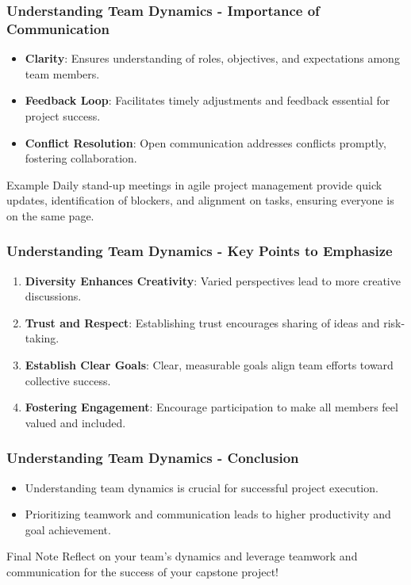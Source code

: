 \documentclass[aspectratio=169]{beamer}
\begin{document}
\begin{frame}[fragile]
    \frametitle{Understanding Team Dynamics - Importance of Communication}
    \begin{itemize}
        \item \textbf{Clarity}: Ensures understanding of roles, objectives, and expectations among team members.
        \item \textbf{Feedback Loop}: Facilitates timely adjustments and feedback essential for project success.
        \item \textbf{Conflict Resolution}: Open communication addresses conflicts promptly, fostering collaboration.
    \end{itemize}
    
    \begin{block}{Example}
        \small
        Daily stand-up meetings in agile project management provide quick updates, identification of blockers, and alignment on tasks, ensuring everyone is on the same page.
    \end{block}
\end{frame}

\begin{frame}[fragile]
    \frametitle{Understanding Team Dynamics - Key Points to Emphasize}
    \begin{enumerate}
        \item \textbf{Diversity Enhances Creativity}: Varied perspectives lead to more creative discussions.
        \item \textbf{Trust and Respect}: Establishing trust encourages sharing of ideas and risk-taking.
        \item \textbf{Establish Clear Goals}: Clear, measurable goals align team efforts toward collective success.
        \item \textbf{Fostering Engagement}: Encourage participation to make all members feel valued and included.
    \end{enumerate}
\end{frame}

\begin{frame}[fragile]
    \frametitle{Understanding Team Dynamics - Conclusion}
    \begin{itemize}
        \item Understanding team dynamics is crucial for successful project execution.
        \item Prioritizing teamwork and communication leads to higher productivity and goal achievement.
    \end{itemize}
    
    \begin{block}{Final Note}
        Reflect on your team’s dynamics and leverage teamwork and communication for the success of your capstone project!
    \end{block}
\end{frame}
\end{document}
